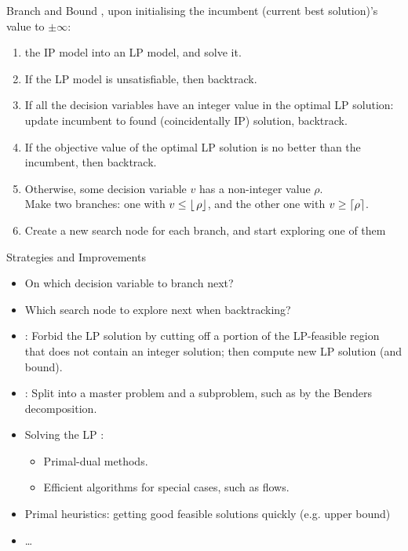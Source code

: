 \documentclass{cons-beamer}
\begin{document}
\begin{frame}{Branch and Bound}\label{ip:bb}
  , upon initialising the incumbent (current best solution)'s value to $\pm\infty$:
  \begin{enumerate}
    \item {} the IP model into an LP model, and solve it.
    \item If the LP model is unsatisfiable, then backtrack.
    \item If all the decision variables have an integer value in the
      optimal LP solution: update incumbent to found (coincidentally IP) solution, backtrack.
    \item If the objective value of the optimal LP solution is no better
      than the incumbent, then backtrack.
    \item Otherwise, some decision variable $v$ has a non-integer value
      $\rho$. \\ Make two branches: one with $v \leq \left\lfloor\,\rho\right\rfloor$,
      and the other one with $v \geq \left\lceil\rho\right\rceil$.
    \item Create a new search node for each branch, and start exploring one of them
  \end{enumerate}
\end{frame}

\begin{frame}{Strategies and Improvements}
  \begin{itemize}
    \item On which decision variable to branch next?
    \item Which search node to explore next when backtracking?
  \end{itemize}
  \vfill

  \begin{itemize}
    \item {}: Forbid the LP  solution by cutting off a portion of the LP-feasible region that does not contain an integer solution; then compute new LP solution (and bound).
    \item {}: Split into a master problem and a
      subproblem, such as by the Benders decomposition.
    \item Solving the LP :
      \begin{itemize}
        \item Primal-dual methods.
        \item Efficient algorithms for special cases, such as flows.
      \end{itemize}
    \item Primal heuristics: getting good feasible solutions quickly (e.g. upper bound)
    \item \dots
  \end{itemize}
\end{frame}
\end{document}
